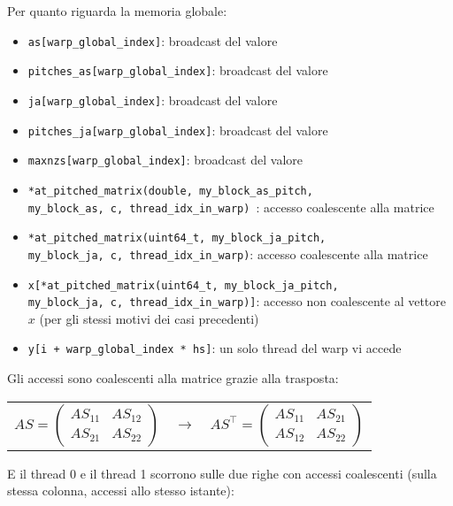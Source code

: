 \documentclass[9pt]{extarticle}
\begin{document}
Per quanto riguarda la memoria globale:

\begin{itemize}
	\item \texttt{as[warp\_global\_index]}: broadcast del valore
	\item \texttt{pitches\_as[warp\_global\_index]}: broadcast del valore
	\item \texttt{ja[warp\_global\_index]}: broadcast del valore
	\item \texttt{pitches\_ja[warp\_global\_index]}: broadcast del valore
	\item \texttt{maxnzs[warp\_global\_index]}: broadcast del valore
	\item \texttt{*at\_pitched\_matrix(double, my\_block\_as\_pitch, \\ my\_block\_as, c, thread\_idx\_in\_warp) }: accesso
	coalescente alla matrice
	\item \texttt{*at\_pitched\_matrix(uint64\_t, my\_block\_ja\_pitch, \\ my\_block\_ja, c, thread\_idx\_in\_warp)}: accesso
	coalescente alla matrice
	\item \texttt{x[*at\_pitched\_matrix(uint64\_t, my\_block\_ja\_pitch, \\ my\_block\_ja, c, thread\_idx\_in\_warp)]}:
	accesso non coalescente al vettore $x$ (per gli stessi motivi dei casi precedenti)
	\item \texttt{y[i + warp\_global\_index * hs]}: un solo thread del warp vi accede
\end{itemize}

Gli accessi sono coalescenti alla matrice grazie alla trasposta:

\begin{minipage}{\linewidth}
\centering
\begin{tabular}{c c c} 
$
AS =
\begin{pmatrix}
AS_{11} & AS_{12} \\
AS_{21} & AS_{22}
\end{pmatrix}
$ &
$\rightarrow$ &
$
AS^{\top} =
\begin{pmatrix}
AS_{11} & AS_{21} \\
AS_{12} & AS_{22}
\end{pmatrix}
$ \\
\end{tabular}
\end{minipage}

E il thread 0 e il thread 1 scorrono sulle due righe con accessi coalescenti (sulla stessa colonna, accessi allo stesso
istante):
\end{document}
